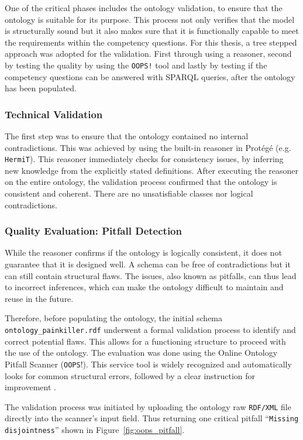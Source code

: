 One of the critical phases includes the ontology validation, to ensure that the ontology is suitable for its purpose. This process not only verifies that the model is structurally sound but it also makes sure that it is functionally capable to meet the requirements within the competency questions. For this thesis, a tree stepped approach was adopted for the validation. First through using a reasoner, second by testing the quality by using the \texttt{OOPS!} tool and lastly by testing if the competency questions can be answered with SPARQL queries, after the ontology has been populated.
\subsubsection*{Technical Validation}
The first step was to ensure that the ontology contained no internal contradictions. This was achieved by using the built-in reasoner in Protégé (e.g. \texttt{HermiT}). This reasoner immediately checks for consistency issues, by inferring new knowledge from the explicitly stated definitions. After executing the reasoner on the entire ontology, the validation process confirmed that the ontology is consistent and coherent. There are no unsatisfiable classes nor logical contradictions.

\subsubsection*{Quality Evaluation: Pitfall Detection}
While the reasoner confirms if the ontology is logically consistent, it does not guarantee that it is designed well. A schema can be free of contradictions but it can still contain structural flaws. The issues, also known as pitfalls, can thus lead to incorrect inferences, which can make the ontology difficult to maintain and reuse in the future.


Therefore, before populating the ontology,  the initial schema  \nolinkurl{ontology_painkiller.rdf} underwent a formal validation process to identify and correct potential flaws. This allows for a functioning structure to proceed with the use of the ontology. The evaluation was done using the Online Ontology Pitfall Scanner (\texttt{OOPS}!). This service tool is widely recognized and  automatically looks for common structural errors, followed by a clear instruction for improvement \cite{oopsWebsite}.

The validation process was initiated by uploading the ontology raw \texttt{RDF/XML} file directly into the scanner’s input field. Thus returning one critical pitfall ``\texttt{Missing disjointness}'' shown in Figure~\ref{fig:oops_pitfall}.

